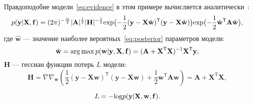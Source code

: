Правдоподобие модели~\eqref{eq:evidence} в этом примере вычисляется аналитически~\cite{hyperopt}:
\begin{equation}
\label{eq:ground}
	p(\mathbf{y}|\mathbf{X},\mathbf{f})  =  (2\pi) ^{-\frac{m}{2}} |\mathbf{A}|^{\frac{1}{2}} |\mathbf{H}|^{-\frac{1}{2}}  \textnormal{exp}\bigl(-\frac{1}{2}(\mathbf{y} -\mathbf{X} \hat{\mathbf{w}})^\mathsf{T}(\mathbf{y} - \mathbf{X}\hat{\mathbf{w}})\bigr)\textnormal{exp} \bigl(-\frac{1}{2}\hat{\mathbf{w}}^\mathsf{T}\mathbf{A}\hat{\mathbf{w}}\bigr),
\end{equation}
где $\hat{\mathbf{w}}$ --- значение наиболее вероятных~\eqref{eq:posterior} параметров модели:
\[
	\hat{\mathbf{w}} = \operatorname*{arg\,max} p(\mathbf{w}|\mathbf{y}, \mathbf{X}, \mathbf{f}) = (\mathbf{A} + \mathbf{X}^\mathsf{T}\mathbf{X})^{-1}\mathbf{X}^\mathsf{T}\mathbf{y},
\]
$\mathbf{H}$ --- гессиан функции потерь $L$ модели:
\[
	\mathbf{H}	= \nabla \nabla_\mathbf{w} \left(\frac{1}{2} (\mathbf{y} -\mathbf{X} {\mathbf{w}})^\mathsf{T}(\mathbf{y} - \mathbf{X}{\mathbf{w}}) + \frac{1}{2}\mathbf{w}^\mathsf{T}\mathbf{A}\mathbf{w} \right) = \mathbf{A} + \mathbf{X}^\mathsf{T}\mathbf{X},
\]

\[ 
	L = - \textnormal{log} p(\mathbf{y}|  \mathbf{X}, \mathbf{w}, \mathbf{f}). 
\]


